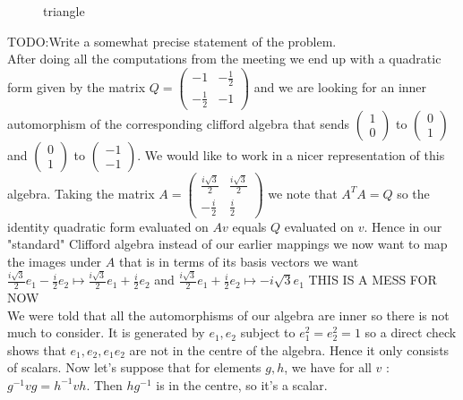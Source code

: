 \documentclass[a4paper]{article}
\begin{document}
\begin{figure}[ht]
    \centering
    \caption{triangle}
    \label{fig:triangle}
\end{figure}
TODO:Write a somewhat precise statement of the problem.\\

After doing all the computations from the meeting we end up with a quadratic form given by the matrix $Q=\begin{pmatrix} -1 & -\frac{1}{2}\\-\frac{1}{2} & -1 \end{pmatrix} $ and we are looking for an inner automorphism of the corresponding clifford algebra that sends $\begin{pmatrix} 1\\0 \end{pmatrix}$ to $\begin{pmatrix} 0\\1 \end{pmatrix}$ and $ \begin{pmatrix}0\\ 1 \end{pmatrix}$ to $\begin{pmatrix} -1\\ -1\end{pmatrix}$. We would like to work in a nicer representation of this algebra. 
Taking the matrix $A=\begin{pmatrix} \frac{i\sqrt{3} }{2} & \frac{i\sqrt{3} }{2}\\-\frac{i}{2}&\frac{i}{2} \end{pmatrix} $ we note that $A^{T}A=Q$ so the identity quadratic form evaluated on $Av$ equals $Q$ evaluated on $v$. Hence in our "standard" Clifford algebra instead of our earlier mappings we now want to map the images under $A$ that is in terms of its basis vectors we want $\frac{i\sqrt{3}}{2}e_1-\frac{i}{2}e_2\mapsto \frac{i\sqrt{3} }{2}e_1+\frac{i}{2}e_2$ and $\frac{i\sqrt{3} }{2}e_1+\frac{i}{2}e_2\mapsto -i\sqrt{3}e_1 $ THIS IS A MESS FOR NOW\\

We were told that all the automorphisms of our algebra are inner so there is not much to consider. It is generated by $e_1,e_2$ subject to $e_1^2=e_2^2=1$ so a direct check shows that $e_1,e_2, e_1e_2$ are not in the centre of the algebra. Hence it only consists of scalars.  Now let's suppose that for elements $g,h$, we have for all  $v$ :  $g^{-1}vg=h^{-1}vh$. Then $hg^{-1}$ is in the centre, so it's a scalar.
\end{document}
